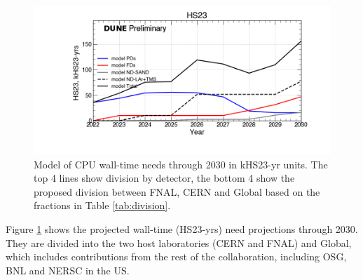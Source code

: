 \documentclass[12pt]{article}
\begin{document}

\begin{figure}[h]
\centering\includegraphics[height=0.4\textwidth]{NearTerm_2024-02-05-2030_noMWC/NearTerm_2024-02-05-2030_noMWC-HS23.png}
\caption{Model of CPU wall-time needs  through 2030 in  kHS23-yr units.  The top 4 lines show division by detector, the bottom 4 show the proposed division between FNAL, CERN and Global based on the fractions in Table \ref{tab:division}.}\label{fig:HS23Main}
\end{figure}


Figure   \ref{fig:HS23Main} shows the projected wall-time  (HS23-yrs) need projections through 2030.   They are divided into the two host laboratories (CERN and FNAL) and Global, which includes contributions from the rest of the collaboration, including OSG, BNL and NERSC in the US. 
\end{document}
